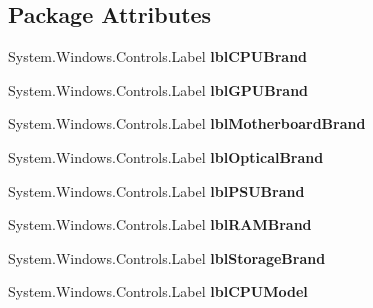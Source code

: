 \subsection*{Package Attributes}
\begin{DoxyCompactItemize}
\item 
System.\+Windows.\+Controls.\+Label {\bfseries lbl\+C\+P\+U\+Brand}\hypertarget{class_p_c_builder_forms_1_1_build_results_aac326fdead6162a7b42085fce0855dca}{}\label{class_p_c_builder_forms_1_1_build_results_aac326fdead6162a7b42085fce0855dca}

\item 
System.\+Windows.\+Controls.\+Label {\bfseries lbl\+G\+P\+U\+Brand}\hypertarget{class_p_c_builder_forms_1_1_build_results_a98f314ca3e9d7396e4247b9b0992beed}{}\label{class_p_c_builder_forms_1_1_build_results_a98f314ca3e9d7396e4247b9b0992beed}

\item 
System.\+Windows.\+Controls.\+Label {\bfseries lbl\+Motherboard\+Brand}\hypertarget{class_p_c_builder_forms_1_1_build_results_ac72a764b2e7f4c92022e8deff175c37c}{}\label{class_p_c_builder_forms_1_1_build_results_ac72a764b2e7f4c92022e8deff175c37c}

\item 
System.\+Windows.\+Controls.\+Label {\bfseries lbl\+Optical\+Brand}\hypertarget{class_p_c_builder_forms_1_1_build_results_ad051e33b794526b15eb9e8148fd304e2}{}\label{class_p_c_builder_forms_1_1_build_results_ad051e33b794526b15eb9e8148fd304e2}

\item 
System.\+Windows.\+Controls.\+Label {\bfseries lbl\+P\+S\+U\+Brand}\hypertarget{class_p_c_builder_forms_1_1_build_results_a8f2c31ef49d8983133ecbbe2d4bcec94}{}\label{class_p_c_builder_forms_1_1_build_results_a8f2c31ef49d8983133ecbbe2d4bcec94}

\item 
System.\+Windows.\+Controls.\+Label {\bfseries lbl\+R\+A\+M\+Brand}\hypertarget{class_p_c_builder_forms_1_1_build_results_aaa15b511e7a706d64cdb28dde00acd8b}{}\label{class_p_c_builder_forms_1_1_build_results_aaa15b511e7a706d64cdb28dde00acd8b}

\item 
System.\+Windows.\+Controls.\+Label {\bfseries lbl\+Storage\+Brand}\hypertarget{class_p_c_builder_forms_1_1_build_results_a8b34235bb45508dd73516279087aa88f}{}\label{class_p_c_builder_forms_1_1_build_results_a8b34235bb45508dd73516279087aa88f}

\item 
System.\+Windows.\+Controls.\+Label {\bfseries lbl\+C\+P\+U\+Model}\hypertarget{class_p_c_builder_forms_1_1_build_results_a829dc7edfb9410bceb2003ca2f6c552d}{}\label{class_p_c_builder_forms_1_1_build_results_a829dc7edfb9410bceb2003ca2f6c552d}


\end{DoxyCompactItemize}
